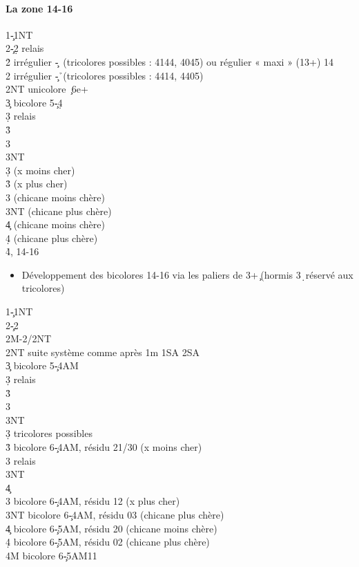 \documentclass[a4paper]{article}
\begin{document}
\paragraph{La zone 14-16}

\begin{bidtable}
1\c-1NT\\
2\c-2\d \> relais\\
2\h \> irrégulier \c -\s\ (tricolores possibles : 4144, 4045) ou régulier « maxi » (13+) 14\\
2\s \> irrégulier \c -\h\ (tricolores possibles : 4414, 4405)\\
2NT \> unicolore \c\ 6e+\\
3\c \> bicolore 5\c -4\d \+\\
3\d \> relais\\
3\h {}\\
3\s {}\\
3NT \-\\
3\d {} (x moins cher)\\
3\h {} (x plus cher)\\
3\s {} (chicane moins chère)\\
3NT  (chicane plus chère)\\
4\c {} (chicane moins chère)\\
4\d {} (chicane plus chère)\\
4\h {}, 14-16
\end{bidtable}

\begin{itemize}
\item Développement des bicolores 14-16 via les paliers de 3+\c\ (hormis 3\d\ réservé aux tricolores)

\end{itemize}

\begin{bidtable}
1\c-1NT\\
2\c-2\d\\
2M-2\s/2NT\\
2NT \> suite système comme après 1m 1SA 2SA\\
3\c \> bicolore 5\c -4AM\+\\
3\d \> relais\+\\
3\h {}\\
3\s {}\\
3NT \-\-\\
3\d \> tricolores possibles\\
3\h \> bicolore 6\c -4AM, résidu 21/30 (x moins cher)\+\\
3\s \> relais\+\\
3NT \\
4\c {}\-\-\\
3\s \> bicolore 6\c -4AM, résidu 12 (x plus cher)\\
3NT \> bicolore 6\c -4AM, résidu 03 (chicane plus chère)\\
4\c \> bicolore 6\c -5AM, résidu 20 (chicane moins chère)\\
4\d \> bicolore 6\c -5AM, résidu 02 (chicane plus chère)\\
4M \> bicolore 6\c -5AM11
\end{bidtable}
\end{document}
